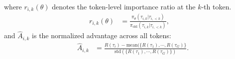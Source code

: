 where $r_{i,k}(\theta)$ denotes the token-level importance ratio at the $k$-th token.
\begin{equation*}
    \begin{aligned}
        r_{i,k}(\theta)&=\frac{\pi_\theta(\tau_{i,k}|\tau_{i,<k})}{\pi_{\text{old}}(\tau_{i,k}|\tau_{i,<k})},
    \end{aligned}
\end{equation*}
and $\hat{A}_{i,k}$ is the normalized advantage across all tokens:
\begin{equation*}
    \begin{aligned}
        \quad \hat{A}_{i,k}&=\frac{R(\tau_i)-\text{mean}(\{R(\tau_1),\cdots,R(\tau_G)\}}{\text{std}(\{R(\tau_1),\cdots,R(\tau_G)\})}.
    \end{aligned}
\end{equation*}





